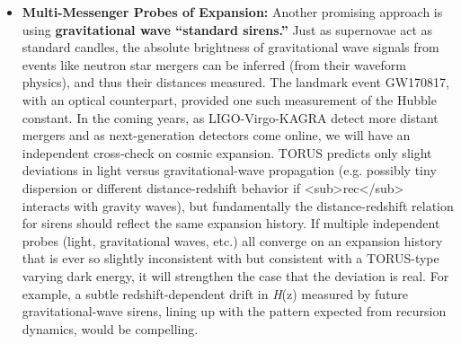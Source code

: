 \documentclass[
]{article}
\begin{document}
\begin{itemize}
  clustering (lower
  S\textless sub\textgreater8\textless/sub\textgreater) than predicted
  by Planck CMB results under \LambdaCDM. TORUS provides a framework where
  recursion-induced modifications could \textbf{suppress the growth of
  structure on certain scales}, offering a possible explanation for this
  discrepancy\hspace{0pt}. Future surveys will clarify this: LSST and
  Euclid will measure the growth rate and clustering amplitude to
  unprecedented accuracy, tracking structure formation from early times
  to now. If they confirm a persistent deviation -- for example, a
  scale-dependent growth rate or an
  S\textless sub\textgreater8\textless/sub\textgreater{} value that
  remains significantly lower than \LambdaCDM predicts -- it could be a
  \textbf{signature of TORUS's extra gravity terms} influencing
  structure formation\hspace{0pt}. Conversely, if structure growth and
  clustering amplitude perfectly match the \LambdaCDM predictions when
  observational uncertainties shrink, it would constrain or rule out the
  need for any recursion-based modification in the dark energy or
  gravity sector.
\item
  \textbf{Multi-Messenger Probes of Expansion:} Another promising
  approach is using \textbf{gravitational wave ``standard sirens.''}
  Just as supernovae act as standard candles, the absolute brightness of
  gravitational wave signals from events like neutron star mergers can
  be inferred (from their waveform physics), and thus their distances
  measured. The landmark event GW170817, with an optical counterpart,
  provided one such measurement of the Hubble constant. In the coming
  years, as LIGO-Virgo-KAGRA detect more distant mergers and as
  next-generation detectors come online, we will have an independent
  cross-check on cosmic expansion. TORUS predicts only slight deviations
  in light versus gravitational-wave propagation (e.g. possibly tiny
  dispersion or different distance-redshift behavior if
  \emph{\Lambda}\textless sub\textgreater rec\textless/sub\textgreater{}
  interacts with gravity waves\hspace{0pt}), but fundamentally the
  distance-redshift relation for sirens should reflect the same
  expansion history. If multiple independent probes (light,
  gravitational waves, etc.) all converge on an expansion history that
  is ever so slightly inconsistent with \LambdaCDM but consistent with a
  TORUS-type varying dark energy, it will strengthen the case that the
  deviation is real. For example, a subtle redshift-dependent drift in
  \emph{H}(z) measured by future gravitational-wave sirens, lining up
  with the pattern expected from recursion dynamics, would be
  compelling.
\end{itemize}
\end{document}
